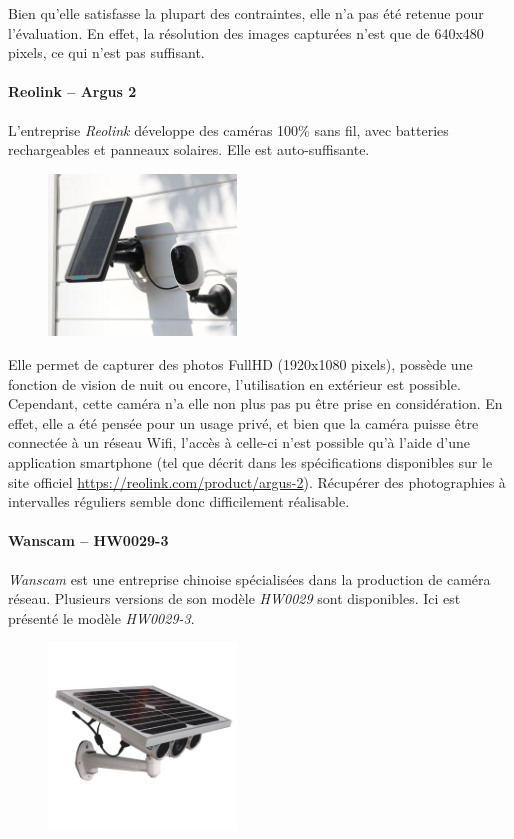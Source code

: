 Bien qu'elle satisfasse la plupart des contraintes, elle n'a pas été retenue pour l'évaluation. En effet, la résolution des images capturées n'est que de 640x480 pixels, ce qui n'est pas suffisant.

\paragraph{\textbf{Reolink} -- Argus 2}
L'entreprise \textit{Reolink} développe des caméras 100\% sans fil, avec batteries rechargeables et panneaux solaires. Elle est auto-suffisante.\autocite{cam:argus2}

\begin{figure}[h]
    \includegraphics[width=50mm]{img/conception/argus2_cam.jpg}
    \centering
\end{figure}

Elle permet de capturer des photos FullHD (1920x1080 pixels), possède une fonction de vision de nuit ou encore, l'utilisation en extérieur est possible. Cependant, cette caméra n'a elle non plus pas pu être prise en considération. En effet, elle a été pensée pour un usage privé, et bien que la caméra puisse être connectée à un réseau Wifi, l'accès à celle-ci n'est possible qu'à l'aide d'une application smartphone (tel que décrit dans les spécifications disponibles sur le site officiel \url{https://reolink.com/product/argus-2}\autocite{cam:argus2}). Récupérer des photographies à intervalles réguliers semble donc difficilement réalisable.

\paragraph{\textbf{Wanscam} -- HW0029-3}

\textit{Wanscam} est une entreprise chinoise spécialisées dans la production de caméra réseau. Plusieurs versions de son modèle \textit{HW0029} sont disponibles. Ici est présenté le modèle \textit{HW0029-3}. \autocite{cam:wan3}

\begin{figure}[h]
    \includegraphics[width=50mm]{img/conception/wan3_cam.jpg}
    \centering
\end{figure}

